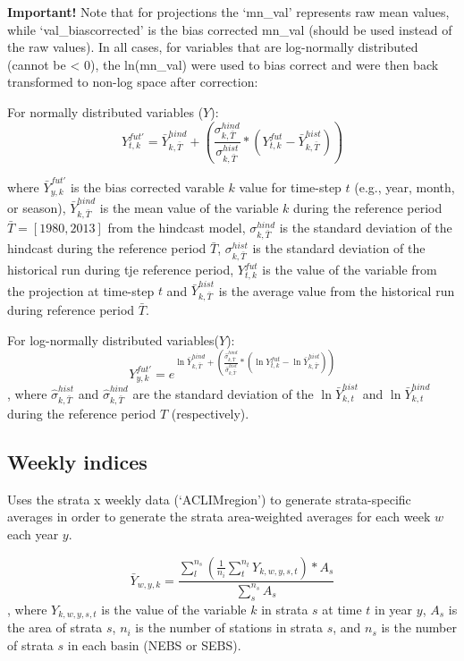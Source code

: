 \documentclass[
]{article}
\begin{document}
\textbf{Important!} Note that for projections the `mn\_val' represents
raw mean values, while `val\_biascorrected' is the bias corrected
mn\_val (should be used instead of the raw values). In all cases, for
variables that are log-normally distributed (cannot be \textless{} 0),
the ln(mn\_val) were used to bias correct and were then back transformed
to non-log space after correction:

For normally distributed variables (\(Y\)):
\[{Y}^{fut'}_{t,k} =\bar{Y}^{hind}_{k,\bar{T}} +\left( \frac{\sigma^{hind}_{k,\bar{T}}}{\sigma^{hist}_{k,\bar{T}}}*({Y}^{fut}_{t,k}-\bar{Y}^{hist}_{k,\bar{T}})  \right )\]

where \(\bar{Y}^{fut'}_{y,k}\) is the bias corrected varable \(k\) value
for time-step \(t\) (e.g., year, month, or season),
\(\bar{Y}^{hind}_{k,\bar{T}}\) is the mean value of the variable \(k\)
during the reference period \(\bar{T}=[1980,2013]\) from the hindcast
model, \(\sigma^{hind}_{k,\bar{T}}\) is the standard deviation of the
hindcast during the reference period \(\bar{T}\),
\(\sigma^{hist}_{k,\bar{T}}\) is the standard deviation of the
historical run during tje reference period, \({Y}^{fut}_{t,k}\) is the
value of the variable from the projection at time-step \(t\) and
\(\bar{Y}^{hist}_{k,\bar{T}}\) is the average value from the historical
run during reference period \(\bar{T}\).

For log-normally distributed variables(\(Y\)):
\[{Y}^{fut'}_{y,k} =e^{\ln\bar{Y}^{hind}_{k,\bar{T}} +\left( \frac{\hat{\sigma}^{hind}_{k,\bar{T}}}{\hat{\sigma}^{hist}_{k,\bar{T}}}*(\ln{Y}^{fut}_{t,k}-\ln\bar{Y}^{hist}_{k,\bar{T}})  \right )}\],
where \(\hat\sigma^{hist}_{k,\bar{T}}\) and
\(\hat\sigma^{hind}_{k,\bar{T}}\) are the standard deviation of the
\(\ln\bar{Y}^{hist}_{k,t}\) and \(\ln\bar{Y}^{hind}_{k,t}\) during the
reference period \(\hat{T}\) (respectively).

\hypertarget{weekly-indices}{%
\subsection{Weekly indices}\label{weekly-indices}}

Uses the strata x weekly data (`ACLIMregion') to generate
strata-specific averages in order to generate the strata area-weighted
averages for each week \(w\) each year \(y\).

\[\bar{Y}_{w,y,k}= \frac{\sum^{n_s}_{l}(\frac{1}{n_i}\sum^{n_t}_{t}Y_{k,w,y,s,t})*A_s} {\sum^{n_s}_{s}{A_s}}\],
where \(Y_{k,w,y,s,t}\) is the value of the variable \(k\) in strata
\(s\) at time \(t\) in year \(y\), \(A_s\) is the area of strata \(s\),
\(n_i\) is the number of stations in strata \(s\), and \(n_s\) is the
number of strata \(s\) in each basin (NEBS or SEBS).
\end{document}
